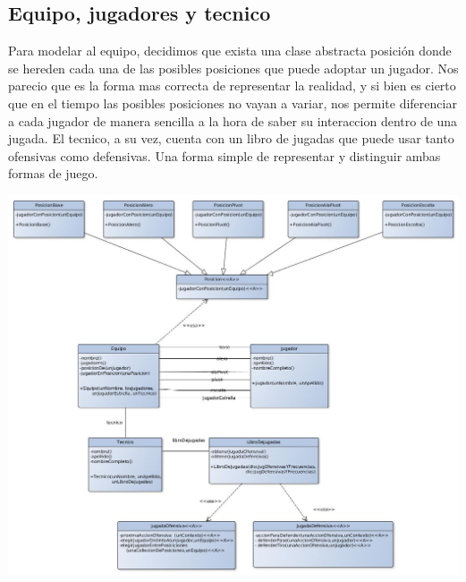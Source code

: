 \subsection{Equipo, jugadores y tecnico}
Para modelar al equipo, decidimos que exista una clase abstracta posición donde se hereden cada una de las posibles posiciones que puede adoptar un jugador. Nos parecio que es la forma mas correcta de representar la realidad, y si bien es cierto que en el tiempo las posibles posiciones no vayan a variar, nos permite diferenciar a cada jugador de manera sencilla a la hora de saber su interaccion dentro de una jugada. El tecnico, a su vez, cuenta con un libro de jugadas que puede usar tanto ofensivas como defensivas. Una forma simple de representar y distinguir ambas formas de juego.
\begin{center}
\includegraphics[scale=0.4]{diseno/equipo.jpg} 
\end{center}

